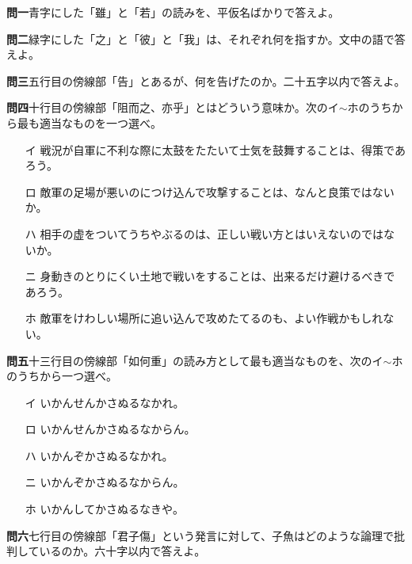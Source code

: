 \documentclass[a4j,landscape,twocolumn]{tarticle}
\newcommand{\re}[3][]{\kundoku{#2}{#1}{#3}{レ }}
\newcommand{\ichi}[3][]{\kundoku{#2}{#1}{#3}{一}}
\renewcommand{\ni}[3][]{\kundoku{#2}{#1}{#3}{二}}
\newcommand{\midashi}[1]{\noindent \textbf{#1}}
\newcommand{\sukima}{\vspace{\baselineskip}}
\begin{document}
\sukima
{}
\midashi{問一\quad}青字にした「雖」と「若」の読みを、平仮名ばかりで答えよ。
\par\vspace{0.5\baselineskip}
\midashi{問二\quad}緑字にした「之」と「彼」と「我」は、それぞれ何を指すか。文中の語で答えよ。
\par\vspace{0.5\baselineskip}
\midashi{問三\quad}五行目の傍線部「告」とあるが、何を告げたのか。二十五字以内で答えよ。
\par\vspace{0.5\baselineskip}
\midashi{問四\quad}十行目の傍線部「阻而\re{鼓}{}之、\ni{不}{}亦\ichi{可}{}乎」とはどういう意味か。次のイ$\sim$ホのうちから最も適当なものを一つ選べ。
\begin{itemize}
	\item[イ]\quad 戦況が自軍に不利な際に太鼓をたたいて士気を鼓舞することは、得策であろう。
	\item[ロ]\quad 敵軍の足場が悪いのにつけ込んで攻撃することは、なんと良策ではないか。
	\item[ハ]\quad 相手の虚をついてうちやぶるのは、正しい戦い方とはいえないのではないか。
	\item[ニ]\quad 身動きのとりにくい土地で戦いをすることは、出来るだけ避けるべきであろう。
	\item[ホ]\quad 敵軍をけわしい場所に追い込んで攻めたてるのも、よい作戦かもしれない。
\end{itemize}
\par\vspace{0.5\baselineskip}
\midashi{問五\quad}十三行目の傍線部「如何\re{勿}{}重」の読み方として最も適当なものを、次のイ$\sim$ホのうちから一つ選べ。
\begin{itemize}
	\item[イ]\quad いかんせんかさぬるなかれ。
	\item[ロ]\quad いかんせんかさぬるなからん。
	\item[ハ]\quad いかんぞかさぬるなかれ。
	\item[ニ]\quad いかんぞかさぬるなからん。
	\item[ホ]\quad いかんしてかさぬるなきや。
\end{itemize}
\par\vspace{0.5\baselineskip}
\midashi{問六\quad}七行目の傍線部「君子\re{不}{}\re{重}{}傷」という発言に対して、子魚はどのような論理で批判しているのか。六十字以内で答えよ。
\end{document}
